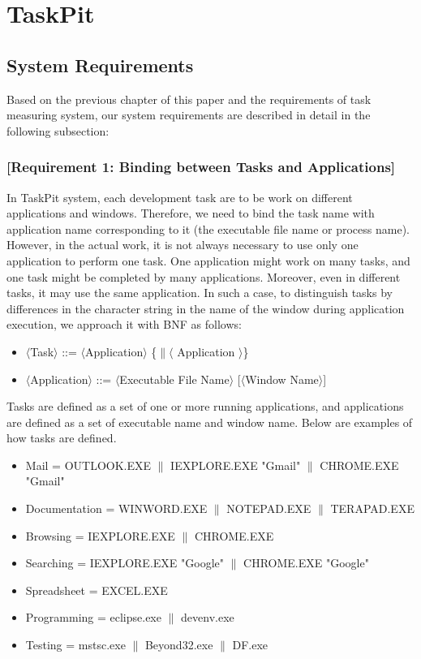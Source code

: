 \documentclass [paper]{ieice}
\begin{document}
\section{TaskPit}

\subsection{System Requirements}
	Based on the previous chapter of this paper and the requirements of task measuring system, our system requirements are described in detail in the following subsection: \par
	
\subsubsection{[Requirement 1: Binding between Tasks and Applications]}
	In TaskPit system, each development task are to be work on different applications and windows. Therefore, we need to bind the task name with application name corresponding to it (the executable file name or process name). However, in the actual work, it is not always necessary to use only one application to perform one task. One application might work on many tasks, and one task might be completed by many applications. Moreover, even in different tasks, it may use the same application. In such a case, to distinguish tasks by differences in the character string in the name of the window during application execution, we approach it with BNF as follows: \par

\begin{itemize}
	\item[] $\langle$Task$\rangle$ ::= $\langle$Application$\rangle$ \{$\|$$\langle$ Application $\rangle$\}
	\item[] $\langle$Application$\rangle$ ::= $\langle$Executable File Name$\rangle$ [$\langle$Window Name$\rangle$]
\end{itemize}

	Tasks are defined as a set of one or more running applications, and applications are defined as a set of executable name and window name. Below are examples of how tasks are defined. \par
	
\begin{itemize}
	\item Mail = OUTLOOK.EXE $\|$ IEXPLORE.EXE "Gmail" $\|$ CHROME.EXE "Gmail"
	\item Documentation = WINWORD.EXE $\|$ NOTEPAD.EXE $\|$ TERAPAD.EXE
	\item Browsing = IEXPLORE.EXE $\|$ CHROME.EXE
	\item Searching = IEXPLORE.EXE "Google" \newline $\|$ CHROME.EXE "Google"
	\item Spreadsheet = EXCEL.EXE
	\item Programming = eclipse.exe $\|$ devenv.exe
	\item Testing = mstsc.exe $\|$ Beyond32.exe $\|$ DF.exe
\end{itemize}
\end{document}

